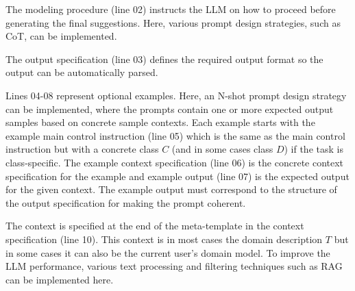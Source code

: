 The modeling procedure (line 02) instructs the LLM on how to proceed before generating the final suggestions. Here, various prompt design strategies, such as CoT, can be implemented.

The output specification (line 03) defines the required output format so the output can be automatically parsed.

Lines 04-08 represent optional examples. Here, an N-shot prompt design strategy can be implemented, where the prompts contain one or more expected output samples based on concrete sample contexts. Each example starts with the example main control instruction (line 05) which is the same as the main control instruction but with a concrete class $C$ (and in some cases class $D$) if the task is class-specific. The example context specification (line 06) is the concrete context specification for the example and example output (line 07) is the expected output for the given context. The example output must correspond to the structure of the output specification for making the prompt coherent.

The context is specified at the end of the meta-template in the context specification (line 10). This context is in most cases the domain description $T$ but in some cases it can also be the current user's domain model. To improve the LLM performance, various text processing and filtering techniques such as RAG can be implemented here.